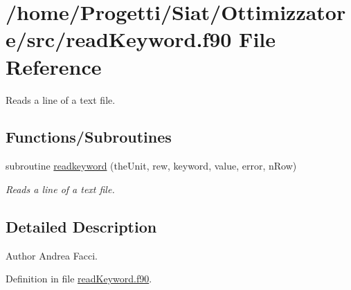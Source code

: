 \hypertarget{read_keyword_8f90}{\section{/home/\-Progetti/\-Siat/\-Ottimizzatore/src/read\-Keyword.f90 File Reference}
\label{read_keyword_8f90}
}


Reads a line of a text file.  


\subsection*{Functions/\-Subroutines}
\begin{DoxyCompactItemize}
\item 
subroutine \hyperlink{read_keyword_8f90_a25147e00369196a9059879141682718f}{readkeyword} (the\-Unit, rew, keyword, value, error, n\-Row)
\begin{DoxyCompactList}\small\item\em Reads a line of a text file. \end{DoxyCompactList}\end{DoxyCompactItemize}


\subsection{Detailed Description}
\begin{DoxyAuthor}{Author}
Andrea Facci. 
\end{DoxyAuthor}


Definition in file \hyperlink{read_keyword_8f90_source}{read\-Keyword.\-f90}.



